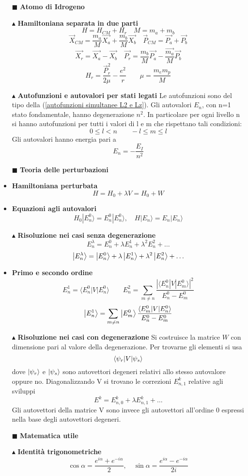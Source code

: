 \documentclass{book}
\newcommand{\g}{\textbf}
\newcommand{\e}{\begin{equation}}
\newcommand{\ex}{\end{equation} }
\renewcommand{\it}{\item[$\cdot$]}
\begin{document}
\begin{multicols}{4}
\begin{itemize}
\item [$\blacksquare$] \g{Atomo di Idrogeno}
\item [$\blacktriangle$] \g{Hamiltoniana separata in due parti}
\e{H = H_{CM} + H_{r} \quad M = m_{a} + m_{b}}\ex
\e{\vec{X}_{CM} = \frac{m_{a}}{M}\vec{X_{a}} + \frac{m_{b}}{M}\vec{X_{b}} \quad \vec{P}_{CM} = \vec{P_{a}} + \vec{P_{b}}}\ex
\e{\vec{X_{r}} = \vec{X_{a}} - \vec{X_{b}} \quad \vec{P_{r}} = \frac{m_{b}}{M}\vec{P_{a}} - \frac{\vec{m_{a}}}{M}\vec{P_{b}}}\ex
\e{H_{r} = \frac{\vec{P}^{2}_{r}}{2 \mu} - \frac{e^{2}}{r} \qquad \mu = \frac{m_{e}m_{p}}{M}}\ex
\item [$\blacktriangle$] \g{Autofunzioni e autovalori per stati legati}
Le autofunzioni sono del tipo della (\ref{autofunzioni simultanee L2 e Lz}). Gli autovalori $E_{n}$, con n=1 stato fondamentale, hanno degenerazione $n^{2}$. In particolare per ogni livello n si hanno autofunzioni per tutti i valori di l e m che rispettano tali condizioni:
\e{0 \leq l  < n \qquad -l \leq m \leq l}\ex
Gli autovalori hanno energia pari a 
\e{E_{n} = - \frac{E_{I}}{n^{2}}}\ex
\item [$\blacksquare$] \g{Teoria delle perturbazioni}
    \it \g{Hamiltoniana perturbata}
        \e{H = H_0 + \lambda V = H_0 + W} \ex
    \it \g{Equazioni agli autovalori}
        \e{H_0 |E_n^0\rangle = E_n^0 |E_n^0\rangle, \quad H |E_n\rangle = E_n |E_n\rangle} \ex
\item [$\blacktriangle$] \g{Risoluzione nei casi senza degenerazione}
\e{E_{n}^{\lambda} = E_{n}^{0} + \lambda E_{n}^{1} + \lambda^{2}E_{n}^{2} + \dots}\ex
\e{\ket{E_{n}^{\lambda}} = \ket{E_{n}^{0}} + \lambda \ket{E_{n}^{1}} + \lambda^{2}\ket{E_{n}^{2}} + \dots}\ex
    \it \g{Primo e secondo ordine}
        \e{E_n^1 = \langle E_n^0 | V | E_n^0 \rangle \qquad E_n^{2} = \sum_{m \neq n} \frac{|\langle E_n^0 | V | E_m^0 \rangle|^2}{E_n^0 - E_m^0}} \ex
        \e{\ket{E_{n}^{1}} =  \sum_{m \neq n} \ket{E_{m}^{0}}\frac{\langle E_m^0 | V | E_n^0 \rangle}{E_n^0 - E_m^0}}\ex
    \item [$\blacktriangle$] \g{Risoluzione nei casi con degenerazione}
    Si costruisce la matrice $W$ con dimensione pari al valore della degenerazione. Per trovarne gli elementi si usa 
    \e{\braket{\psi_{r}|V}{\psi_{s}}}\ex dove $\ket{\psi_{r}}$ e $\ket{\psi_{s}}$ sono autovettori degeneri relativi allo stesso autovalore oppure no. Diagonalizzando V si trovano le correzioni $E_{n,1}^{k}$ relative agli sviluppi
    \e{E^{k} = E_{n, 0}^{k} + \lambda E_{n,1}^{k} + \dots}\ex
    Gli autovettori della matrice V sono invece gli autovettori all'ordine 0 espressi nella base degli autovettori degeneri.
\item [$\blacksquare$] \g{Matematica utile}
    \item [$\blacktriangle$] \g{Identità trigonometriche}
        \e{\cos\alpha = \frac{e^{i\alpha} + e^{-i\alpha}}{2}, \quad \sin\alpha = \frac{e^{i\alpha} - e^{-i\alpha}}{2i}} \ex


\end{itemize}
\end{multicols}
\end{document}
